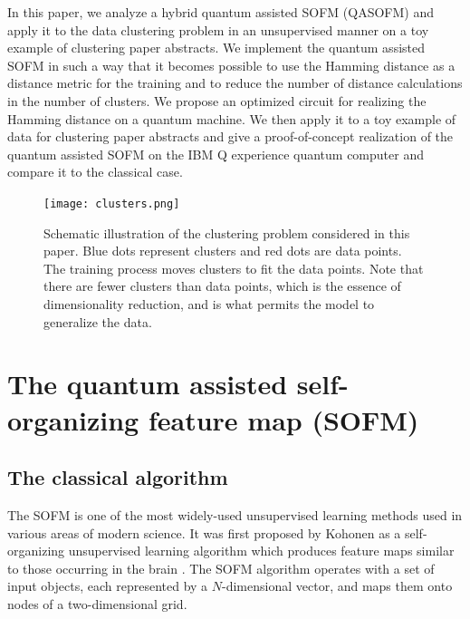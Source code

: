 \documentclass[pra,showkeys,twocolumn,showpacs]{revtex4-1}
\begin{document}
In this paper, we analyze  a hybrid quantum assisted SOFM (QASOFM) and apply it to the data clustering problem in an unsupervised manner on a toy example of clustering paper abstracts.   We implement the quantum assisted SOFM in such a way that it becomes possible to use the Hamming distance as a distance metric for the training and to reduce the number of distance calculations in the number of clusters. We propose an optimized circuit for realizing the Hamming distance on a quantum machine. We then apply it to a toy example of data for clustering paper abstracts and give a proof-of-concept realization of the quantum assisted SOFM on the IBM Q experience quantum computer \cite{ibmq} and compare it to the classical case.

\begin{figure}
  \texttt{[image: clusters.png]}
\caption{Schematic illustration of the clustering problem considered in this paper.  Blue dots represent clusters and red dots are data points. The training process moves clusters to fit the data points. Note that there are fewer clusters than data points, which is the essence of dimensionality reduction, and is what permits the model to generalize the data.}
\label{clusters}
\end{figure}


























\section{The quantum assisted self-organizing feature map (SOFM)}
\label{sec:qasofm}



\subsection{The classical algorithm}


The SOFM is one of the most widely-used unsupervised learning methods used in various areas of modern science. It was first proposed by Kohonen as a self-organizing unsupervised learning algorithm which produces feature maps similar to those occurring in the brain \cite{solan2001}. The SOFM algorithm operates with a set of input objects, each represented by a $N$-dimensional vector, and maps them onto nodes of a two-dimensional grid.
\end{document}
